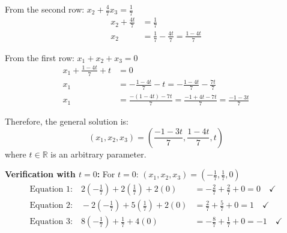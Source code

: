 From the second row: $x_2 + \frac{4}{7}x_3 = \frac{1}{7}$
\begin{align*}
	x_2 + \frac{4t}{7} & = \frac{1}{7}                                 \\
	x_2                & = \frac{1}{7} - \frac{4t}{7} = \frac{1-4t}{7}
\end{align*}

From the first row: $x_1 + x_2 + x_3 = 0$
\begin{align*}
	x_1 + \frac{1-4t}{7} + t & = 0                                                             \\
	x_1                      & = -\frac{1-4t}{7} - t = -\frac{1-4t}{7} - \frac{7t}{7}          \\
	x_1                      & = \frac{-(1-4t) - 7t}{7} = \frac{-1+4t-7t}{7} = \frac{-1-3t}{7}
\end{align*}

Therefore, the general solution is:
\[
	\boxed{(x_1, x_2, x_3) = \left(\frac{-1-3t}{7}, \frac{1-4t}{7}, t\right)}
\]
where $t \in \mathbb{R}$ is an arbitrary parameter.

\textbf{Verification with $t = 0$:}
For $t = 0$: $(x_1, x_2, x_3) = \left(-\frac{1}{7}, \frac{1}{7}, 0\right)$
\begin{align*}
	\text{Equation 1:} \quad 2\left(-\frac{1}{7}\right) + 2\left(\frac{1}{7}\right) + 2(0)  & = -\frac{2}{7} + \frac{2}{7} + 0 = 0 \quad \checkmark  \\
	\text{Equation 2:} \quad -2\left(-\frac{1}{7}\right) + 5\left(\frac{1}{7}\right) + 2(0) & = \frac{2}{7} + \frac{5}{7} + 0 = 1 \quad \checkmark   \\
	\text{Equation 3:} \quad 8\left(-\frac{1}{7}\right) + \frac{1}{7} + 4(0)                & = -\frac{8}{7} + \frac{1}{7} + 0 = -1 \quad \checkmark
\end{align*}